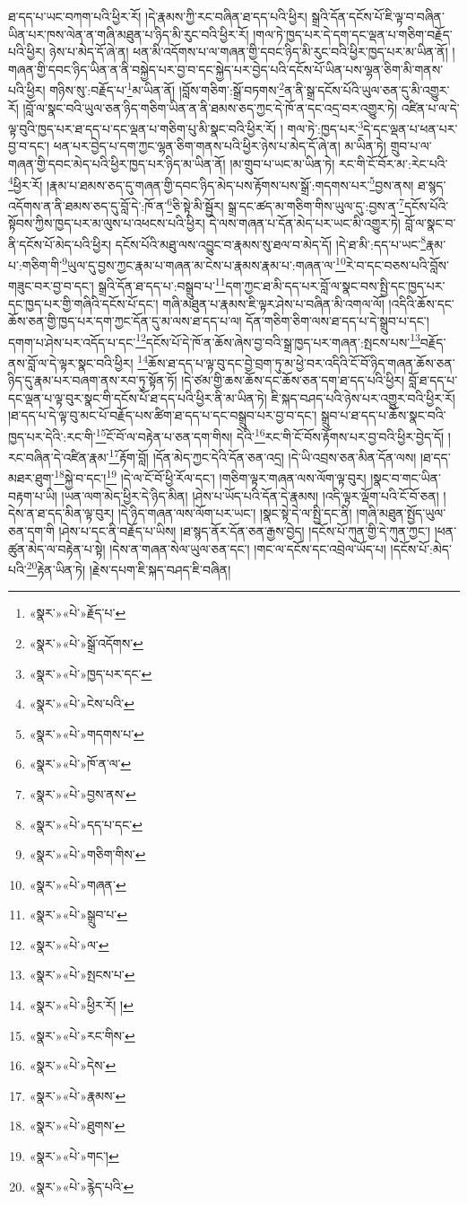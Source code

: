 ཐ་དད་པ་ཡང་བཀག་པའི་ཕྱིར་རོ། །དེ་རྣམས་ཀྱི་རང་བཞིན་ཐ་དད་པའི་ཕྱིར། སྒྲའི་དོན་དངོས་པོ་ཇི་ལྟ་བ་བཞིན་ཡིན་པར་ཁས་ལེན་ན་གཞི་མཐུན་པ་ཉིད་མི་རུང་བའི་ཕྱིར་རོ། །གལ་ཏེ་ཁྱད་པར་དེ་དག་དང་ལྡན་པ་གཅིག་བརྗོད་པའི་ཕྱིར། ཉེས་པ་མེད་དོ་ཞེ་ན། ཕན་མི་འདོགས་པ་ལ་གཞན་གྱི་དབང་ཉིད་མི་རུང་བའི་ཕྱིར་ཁྱད་པར་མ་ཡིན་ནོ། །གཞན་གྱི་དབང་ཉིད་ཡིན་ན་ནི་བསྐྱེད་པར་བྱ་བ་དང་སྐྱེད་པར་བྱེད་པའི་དངོས་པོ་ཡིན་པས་ལྷན་ཅིག་མི་གནས་པའི་ཕྱིར། གཉིས་སུ་:བརྗོད་པ་\footnote{«སྣར་»«པེ་»རྗོད་པ་}མ་ཡིན་ནོ། །བློས་གཅིག་:སྒྲོ་བཏགས་\footnote{«སྣར་»«པེ་»སྒྲོ་འདོགས་}ན་ནི་སྒྲ་དངོས་པོའི་ཡུལ་ཅན་དུ་མི་འགྱུར་རོ། །བློ་ལ་སྣང་བའི་ཡུལ་ཅན་ཉིད་གཅིག་ཡིན་ན་ནི་ཐམས་ཅད་ཀྱང་དེ་ཁོ་ན་དང་འདྲ་བར་འགྱུར་ཏེ། འཛིན་པ་ལ་དེ་ལྟ་བུའི་ཁྱད་པར་ཐ་དད་པ་དང་ལྡན་པ་གཅིག་པུ་མི་སྣང་བའི་ཕྱིར་རོ། །
གལ་ཏེ་:ཁྱད་པར་\footnote{«སྣར་»«པེ་»ཁྱད་པར་དང་}དེ་དང་ལྡན་པ་ཕན་པར་བྱ་བ་དང་། ཕན་པར་བྱེད་པ་དག་ཀྱང་ལྷན་ཅིག་གནས་པའི་ཕྱིར་ཉེས་པ་མེད་དོ་ཞེ་ན། མ་ཡིན་ཏེ། གྲུབ་པ་ལ་གཞན་གྱི་དབང་མེད་པའི་ཕྱིར་ཁྱད་པར་ཉིད་མ་ཡིན་ནོ། །མ་གྲུབ་པ་ཡང་མ་ཡིན་ཏེ། རང་གི་ངོ་བོར་མ་:རེང་པའི་\footnote{«སྣར་»«པེ་»ངེས་པའི་}ཕྱིར་རོ། །རྣམ་པ་ཐམས་ཅད་དུ་གཞན་གྱི་དབང་ཉིད་མེད་པས་རྟོགས་པས་སྒྲོ་:གདགས་པར་\footnote{«སྣར་»«པེ་»གདགས་པ་}བྱས་ནས། ཐ་སྙད་འདོགས་ན་ནི་ཐམས་ཅད་དུ་བློ་དེ་:ཁོ་ན་\footnote{«སྣར་»«པེ་»ཁོ་ན་ལ་}ཅི་སྟེ་མི་སྦྱོར། སྒྲ་དང་ཚད་མ་གཅིག་གིས་ཡུལ་དུ་:བྱས་ན་\footnote{«སྣར་»«པེ་»བྱས་ནས་}དངོས་པོའི་སྟོབས་ཀྱིས་ཁྱད་པར་མ་ལུས་པ་འཕངས་པའི་ཕྱིར། དེ་ལས་གཞན་པ་དོན་མེད་པར་ཡང་མི་འགྱུར་ཏེ། བློ་ལ་སྣང་བ་ནི་དངོས་པོ་མེད་པའི་ཕྱིར། དངོས་པོའི་མཐུ་ལས་འབྱུང་བ་རྣམས་སུ་ཐལ་བ་མེད་དོ། །དེ་ཐ་མི་:དད་པ་ཡང་\footnote{«སྣར་»«པེ་»དད་པ་དང་}རྣམ་པ་:གཅིག་གི་\footnote{«སྣར་»«པེ་»གཅིག་གིས་}ཡུལ་དུ་བྱས་ཀྱང་རྣམ་པ་གཞན་མ་ངེས་པ་རྣམས་རྣམ་པ་:གཞན་ལ་\footnote{«སྣར་»«པེ་»གཞན་}རེ་བ་དང་བཅས་པའི་བློས་གཟུང་བར་བྱ་བ་དང་། སྒྲའི་དོན་ཐ་དད་པ་:བསྒྲུབ་པ་\footnote{«སྣར་»«པེ་»སྒྲུབ་པ་}དག་ཀྱང་ཐ་མི་དད་པར་བློ་ལ་སྣང་བས་སྤྱི་དང་ཁྱད་པར་དང་ཁྱད་པར་གྱི་གཞིའི་དངོས་པོ་དང་། གཞི་མཐུན་པ་རྣམས་ཇི་ལྟར་ཤེས་པ་བཞིན་མི་འགལ་ལོ། །འདིའི་ཆོས་དང་ཆོས་ཅན་གྱི་ཁྱད་པར་དག་ཀྱང་དོན་དུ་མ་ལས་ཐ་དད་པ་ལ། དོན་གཅིག་ཅིག་ལས་ཐ་དད་པ་དེ་སྒྲུབ་པ་དང་། དགག་པ་ཤེས་པར་འདོད་པ་དང་\footnote{«སྣར་»«པེ་»ལ་}དངོས་པོ་དེ་ཁོ་ན་ཆོས་ཞེས་བྱ་བའི་སྒྲ་ཁྱད་པར་གཞན་:སྤངས་པས་\footnote{«སྣར་»«པེ་»སྤངས་པ་}བརྗོད་ནས་བློ་ལ་དེ་ལྟར་སྣང་བའི་ཕྱིར། \footnote{«སྣར་»«པེ་»ཕྱིར་རོ། ། }ཆོས་ཐ་དད་པ་ལྟ་བུ་དང་བྱེ་བྲག་ཏུ་མ་ཕྱེ་བར་འདིའི་ངོ་བོ་ཉིད་གཞན་ཆོས་ཅན་ཉིད་དུ་རྣམ་པར་བཞག་ནས་རབ་ཏུ་སྟོན་ཏོ། །དེ་ཙམ་གྱི་ཆས་ཆོས་དང་ཆོས་ཅན་དག་ཐ་དད་པའི་ཕྱིར། བློ་ཐ་དད་པ་དང་ལྡན་པ་ལྟ་བུར་སྣང་གི་དངོས་པོ་ཐ་དད་པའི་ཕྱིར་ནི་མ་ཡིན་ཏེ། ཇི་སྐད་བཤད་པའི་ཉེས་པར་འགྱུར་བའི་ཕྱིར་རོ། །ཐ་དད་པ་དེ་ལྟ་བུ་མང་པོ་བརྗོད་པས་ཚིག་ཐ་དད་པ་དང་བསྒྲུབ་པར་བྱ་བ་དང་། སྒྲུབ་པ་ཐ་དད་པ་ཆོས་སྣང་བའི་ཁྱད་པར་དེའི་:རང་གི་\footnote{«སྣར་»«པེ་»རང་གིས་}ངོ་བོ་ལ་བརྟེན་པ་ཅན་དག་གིས། དེའི་\footnote{«སྣར་»«པེ་»དེས་}རང་གི་ངོ་བོས་རྟོགས་པར་བྱ་བའི་ཕྱིར་བྱེད་དོ། །རང་བཞིན་དེ་འཛིན་རྣམ་\footnote{«སྣར་»«པེ་»རྣམས་}རྟོག་བློ། །དོན་མེད་ཀྱང་དེའི་དོན་ཅན་འདྲ། །དེ་ཡི་འབྲས་ཅན་མིན་དོན་ལས། །ཐ་དད་མཐར་ཐུག་\footnote{«སྣར་»«པེ་»ཐུགས་}སྐྱེ་བ་དང་།\footnote{«སྣར་»«པེ་»གང་།} །དེ་ལ་ངོ་བོ་ཕྱི་རོལ་དང་། །གཅིག་ལྟར་གཞན་ལས་ལོག་ལྟ་བུར། །སྣང་བ་གང་ཡིན་བརྟག་པ་ཡི། །ཡན་ལག་མེད་ཕྱིར་དེ་ཉིད་མིན། །ཤེས་པ་ཡོད་པའི་དོན་དེ་རྣམས། །འདི་ལྟར་ལྡོག་པའི་ངོ་བོ་ཅན། །དེས་ན་ཐ་དད་མིན་ལྟ་བུར། །དེ་ཉིད་གཞན་ལས་ལོག་པར་ཡང་། །སྣང་སྟེ་དེ་ལ་སྤྱི་དང་ནི། །གཞི་མཐུན་སྤྱོད་ཡུལ་ཅན་དག་གི །ཤེས་པ་དང་ནི་བརྗོད་པ་ཡིས། །ཐ་སྙད་ནོར་དོན་ཅན་རྒྱས་བྱེད། །དངོས་པོ་ཀུན་གྱི་དེ་ཀུན་ཀྱང་། །ཕན་ཚུན་མེད་ལ་བརྟེན་པ་སྟེ། །དེས་ན་གཞན་སེལ་ཡུལ་ཅན་དང་། །གང་ལ་དངོས་དང་འབྲེལ་ཡོད་པ། །དངོས་པོ་:མེད་པའི་\footnote{«སྣར་»«པེ་»རྙེད་པའི་}རྟེན་ཡིན་ཏེ། །རྗེས་དཔག་ཇི་སྐད་བཤད་ཇི་བཞིན། 